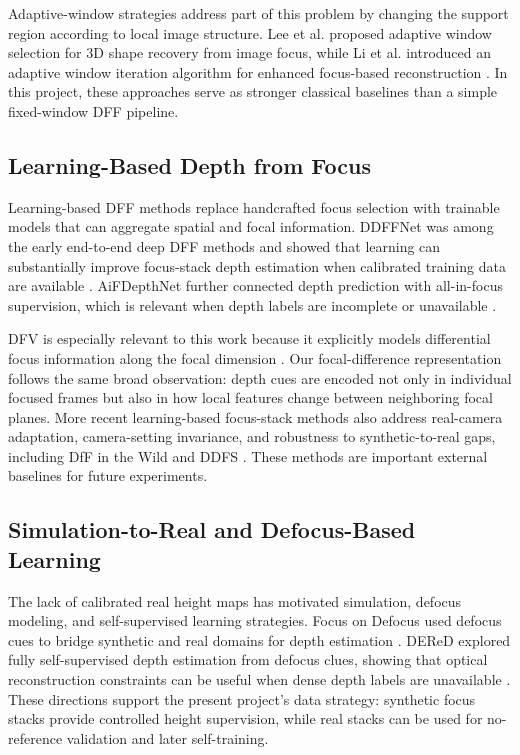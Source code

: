 \documentclass[11pt,a4paper]{article}
\begin{document}
Adaptive-window strategies address part of this problem by changing the support region according to local image structure. Lee et al. proposed adaptive window selection for 3D shape recovery from image focus, while Li et al. introduced an adaptive window iteration algorithm for enhanced focus-based reconstruction \cite{lee_adaptive_2013,li_adaptive_2019}. In this project, these approaches serve as stronger classical baselines than a simple fixed-window DFF pipeline.

\subsection{Learning-Based Depth from Focus}

Learning-based DFF methods replace handcrafted focus selection with trainable models that can aggregate spatial and focal information. DDFFNet was among the early end-to-end deep DFF methods and showed that learning can substantially improve focus-stack depth estimation when calibrated training data are available \cite{jawahar_deep_2019}. AiFDepthNet further connected depth prediction with all-in-focus supervision, which is relevant when depth labels are incomplete or unavailable \cite{wang_bridging_2021}.

DFV is especially relevant to this work because it explicitly models differential focus information along the focal dimension \cite{yang_deep_2022}. Our focal-difference representation follows the same broad observation: depth cues are encoded not only in individual focused frames but also in how local features change between neighboring focal planes. More recent learning-based focus-stack methods also address real-camera adaptation, camera-setting invariance, and robustness to synthetic-to-real gaps, including DfF in the Wild and DDFS \cite{won_learning_2022,fujimura_deep_2024}. These methods are important external baselines for future experiments.

\subsection{Simulation-to-Real and Defocus-Based Learning}

The lack of calibrated real height maps has motivated simulation, defocus modeling, and self-supervised learning strategies. Focus on Defocus used defocus cues to bridge synthetic and real domains for depth estimation \cite{maximov_focus_2020}. DEReD explored fully self-supervised depth estimation from defocus clues, showing that optical reconstruction constraints can be useful when dense depth labels are unavailable \cite{si_fully_2023}. These directions support the present project's data strategy: synthetic focus stacks provide controlled height supervision, while real stacks can be used for no-reference validation and later self-training.
\end{document}
